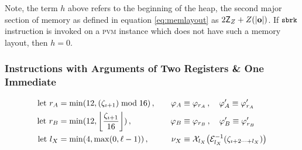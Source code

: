 Note, the term $h$ above refers to the beginning of the heap, the second major section of memory as defined in equation \ref{eq:memlayout} as $2\mathsf{Z}_Z + \rnq{\len{\mathbf{o}}}$. If $\text{{\small \texttt{sbrk}}}$ instruction is invoked on a \textsc{pvm} instance which does not have such a memory layout, then $h = 0$.

\subsubsection{Instructions with Arguments of Two Registers \& One Immediate}
\begin{equation}
\begin{aligned}
  \using r_A &= \min(12, (\instructions_{\imath+1}) \bmod 16) \,,\quad&
  \reg_A &\equiv \reg_{r_A} \,,\quad
  \reg'_A \equiv \reg'_{r_A} \\
  \using r_B &= \min(12, \ffrac{\instructions_{\imath+1}}{16}) \,,\quad&
  \reg_B &\equiv \reg_{r_B} \,,\quad
  \reg'_B \equiv \reg'_{r_B} \\
  \using l_X &= \min(4, \max(0, \ell - 1)) \,,\quad&
  \immed_X &\equiv \sext{l_X}{\decode[l_X]{\instructions\subrange{\imath+2}{l_X}}}
\end{aligned}
\end{equation}

